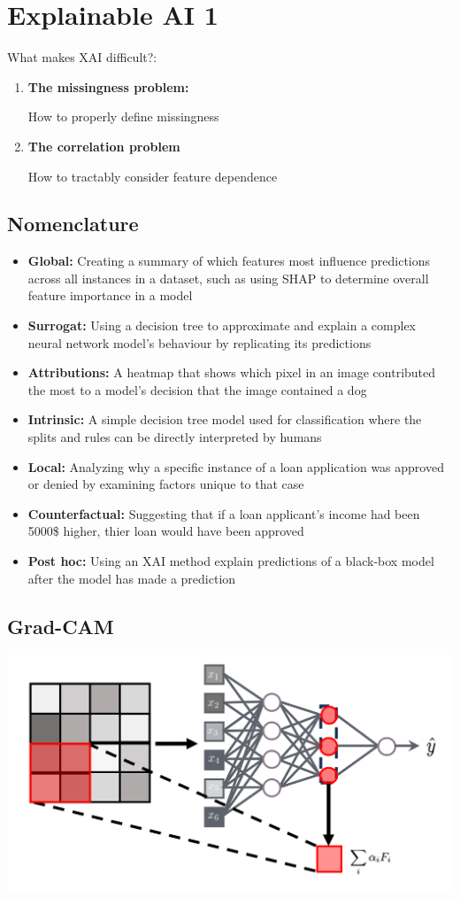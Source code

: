\section{Explainable AI 1}
What makes XAI difficult?:
\begin{enumerate}
    \item \textbf{The missingness problem:}
    
    How to properly define missingness
    \item \textbf{The correlation problem}
    
    How to tractably consider feature dependence
\end{enumerate}

\subsection{Nomenclature}
\begin{itemize}
    \item \textbf{Global:} Creating a summary of which features most influence predictions across all instances in a dataset, such as using SHAP to determine overall feature importance in a model
    \item \textbf{Surrogat:} Using a decision tree to approximate and explain a complex neural network model's behaviour by replicating its predictions
    \item \textbf{Attributions:} A heatmap that shows which pixel in an image contributed the most to a model's decision that the image contained a dog
    \item \textbf{Intrinsic:} A simple decision tree model used for classification where the splits and rules can be directly interpreted by humans
    \item \textbf{Local:} Analyzing why a specific instance of a loan application was approved or denied by examining factors unique to that case
    \item \textbf{Counterfactual:} Suggesting that if a loan applicant's income had been 5000\$ higher, thier loan would have been approved
    \item \textbf{Post hoc:} Using an XAI method explain predictions of a black-box model after the model has made a prediction
\end{itemize}

\subsection{Grad-CAM}
\includegraphics[width = \columnwidth]{figures/XAI1/GradCAM.png}

